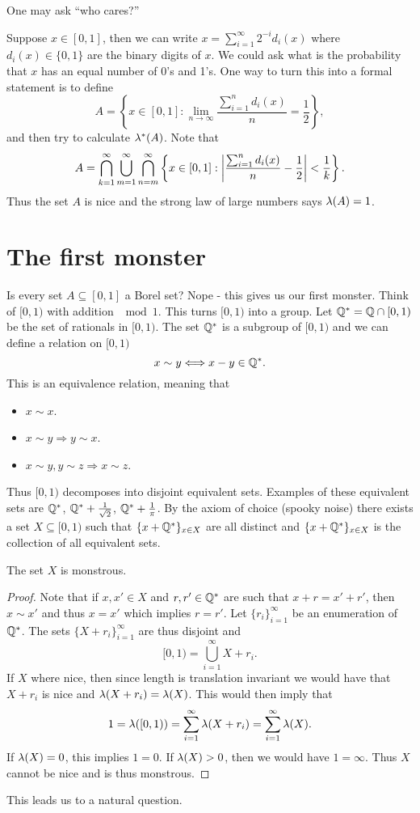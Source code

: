 One may ask ``who cares?''
\begin{ex}
    Suppose $x \in [0,1]$, then we can write $x = \sum_{i=1}^\infty 2^{-i}d_i(x)$ where $d_i(x) \in \{0,1\}$ are the binary digits of $x$. We could ask what is the probability that $x$ has an equal number of 0's and 1's. One way to turn this into a formal statement is to define 
    \[A = \left\{x \in [0,1] : \lim_{n \to \infty} \frac{\sum_{i=1}^n d_i(x)}{n} = \frac{1}{2}\right\}, \]
    and then try to calculate $\lambda^*(A)$. Note that 
    \[A = \bigcap_{k=1}^{\infty} \bigcup_{m=1}^\infty \bigcap_{n=m}^\infty \left\{x \in [0,1] : {\left\lvert\frac{\sum_{i=1}^n d_i(x)}{n}-\frac{1}{2}\right\rvert} < \frac{1}{k} \right\}. \]
    Thus the set $A$ is nice and the strong law of large numbers says $\lambda(A) = 1$.
\end{ex}
\section{The first monster}
Is every set $A \subseteq [0,1]$ a Borel set? Nope - this gives us our first monster. Think of $[0,1)$ with addition $\mod 1$. This turns $[0,1)$ into a group. Let ${\mathbb{Q}}^* = {\mathbb{Q}} \cap [0,1)$ be the set of rationals in $[0,1)$. The set ${\mathbb{Q}}^*$ is a subgroup of $[0,1)$ and we can define a relation on $[0,1)$
\[x \sim y \Longleftrightarrow x-y \in {\mathbb{Q}}^*. \]
This is an equivalence relation, meaning that
\begin{itemize}
    \item $x \sim x$.
    \item $x \sim y \Longrightarrow y \sim x$.
    \item $x \sim y, y \sim z \Longrightarrow x \sim z$.
\end{itemize}
Thus $[0,1)$ decomposes into disjoint equivalent sets. Examples of these equivalent sets are ${\mathbb{Q}}^*$, ${\mathbb{Q}}^*+\frac{1}{\sqrt{2}}$, ${\mathbb{Q}}^*+\frac{1}{\pi}$. By the axiom of choice (spooky noise) there exists a set $X \subseteq [0,1)$ such that $\{x + {\mathbb{Q}}^*\}_{x \in X}$ are all distinct and $\{x + {\mathbb{Q}}^*\}_{x \in X}$ is the collection of all equivalent sets. 

\begin{claim}
    The set $X$ is monstrous.
\end{claim}
\begin{proof}
    Note that if $x,x'\in X$ and $r,r' \in {\mathbb{Q}}^*$ are such that $x+r=x'+r'$, then $x \sim x'$ and thus $x =x'$ which implies $r=r'$. Let $\{r_i\}_{i=1}^\infty$ be an enumeration of ${\mathbb{Q}}^*$. The sets $\{X+r_i\}_{i=1}^\infty$ are thus disjoint and 
    \[[0,1) = \bigcup_{i=1}^\infty X+r_i. \]
    If $X$ where nice, then since length is translation invariant we would have that $X+r_i$ is nice and $\lambda(X+r_i) = \lambda(X)$. This would then imply that
    \[1=\lambda([0,1)) = \sum_{i=1}^\infty \lambda(X+r_i) = \sum_{i=1}^\infty \lambda(X). \]
    If $\lambda(X) = 0$, this implies $1=0$. If $\lambda(X) > 0$, then we would have $1=\infty$. Thus $X$ cannot be nice and is thus monstrous.
\end{proof}
This leads us to a natural question.

